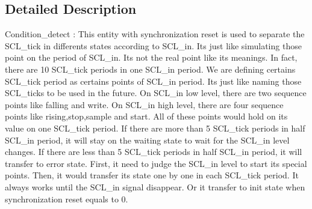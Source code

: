 \subsection{Detailed Description}
Condition\+\_\+detect \+: This entity with synchronization reset is used to separate the S\+C\+L\+\_\+tick in differents states according to S\+C\+L\+\_\+in. It\textquotesingle{}s just like simulating those point on the period of S\+C\+L\+\_\+in. It\textquotesingle{}s not the real point like its meanings. In fact, there are 10 S\+C\+L\+\_\+tick periods in one S\+C\+L\+\_\+in period. We are defining certains S\+C\+L\+\_\+tick period as certains points of S\+C\+L\+\_\+in period. It\textquotesingle{}s just like naming those S\+C\+L\+\_\+ticks to be used in the future. On S\+C\+L\+\_\+in low level, there are two sequence points like falling and write. On S\+C\+L\+\_\+in high level, there are four sequence points like rising,stop,sample and start. All of these points would hold on its value on one S\+C\+L\+\_\+tick period. If there are more than 5 S\+C\+L\+\_\+tick periods in half S\+C\+L\+\_\+in period, it will stay on the waiting state to wait for the S\+C\+L\+\_\+in level changes. If there are less than 5 S\+C\+L\+\_\+tick periods in half S\+C\+L\+\_\+in period, it will transfer to error state. First, it need to judge the S\+C\+L\+\_\+in level to start its special points. Then, it would transfer its state one by one in each S\+C\+L\+\_\+tick period. It always works until the S\+C\+L\+\_\+in signal disappear. Or it transfer to init state when synchronization reset equals to \textquotesingle{}0\textquotesingle{}. 

